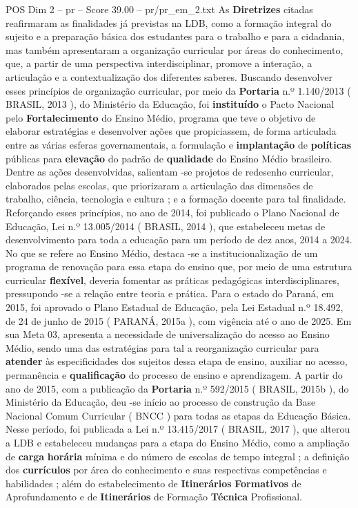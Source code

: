 \begin{textsample}{POS Dim 2 – pr – Score 39.00 – pr/pr\_em\_2.txt}
As \textbf{Diretrizes} citadas reafirmaram as finalidades já previstas na LDB, como a formação integral do sujeito e a preparação básica dos estudantes para o trabalho e para a cidadania, mas também apresentaram a organização curricular por áreas do conhecimento, que, a partir de uma perspectiva interdisciplinar, promove a interação, a articulação e a contextualização dos diferentes saberes.
Buscando desenvolver esses princípios de organização curricular, por meio da \textbf{Portaria} n.º 1.140/2013 ( BRASIL, 2013 ), do Ministério da Educação, foi \textbf{instituído} o Pacto Nacional pelo \textbf{Fortalecimento} do Ensino Médio, programa que teve o objetivo de elaborar estratégias e desenvolver ações que propiciassem, de forma articulada entre as várias esferas governamentais, a formulação e \textbf{implantação} de \textbf{políticas} públicas para \textbf{elevação} do padrão de \textbf{qualidade} do Ensino Médio brasileiro.
Dentre as ações desenvolvidas, salientam -se projetos de redesenho curricular, elaborados pelas escolas, que priorizaram a articulação das dimensões de trabalho, ciência, tecnologia e cultura ; e a formação docente para tal finalidade.
Reforçando esses princípios, no ano de 2014, foi publicado o Plano Nacional de Educação, Lei n.º 13.005/2014 ( BRASIL, 2014 ), que estabeleceu metas de desenvolvimento para toda a educação para um período de dez anos, 2014 a 2024.
No que se refere ao Ensino Médio, destaca -se a institucionalização de um programa de renovação para essa etapa do ensino que, por meio de uma estrutura curricular \textbf{flexível}, deveria fomentar as práticas pedagógicas interdisciplinares, pressupondo -se a relação entre teoria e prática.
Para o estado do Paraná, em 2015, foi aprovado o Plano Estadual de Educação, pela Lei Estadual n.º 18.492, de 24 de junho de 2015 ( PARANÁ, 2015a ), com vigência até o ano de 2025.
Em sua Meta 03, apresenta a necessidade de universalização do acesso ao Ensino Médio, sendo uma das estratégias para tal a reorganização curricular para \textbf{atender} às especificidades dos sujeitos dessa etapa de ensino, auxiliar no acesso, permanência e \textbf{qualificação} do processo de ensino e aprendizagem.
A partir do ano de 2015, com a publicação da \textbf{Portaria} n.º 592/2015 ( BRASIL, 2015b ), do Ministério da Educação, deu -se início ao processo de construção da Base Nacional Comum Curricular ( BNCC ) para todas as etapas da Educação Básica.
Nesse período, foi publicada a Lei n.º 13.415/2017 ( BRASIL, 2017 ), que alterou a LDB e estabeleceu mudanças para a etapa do Ensino Médio, como a ampliação de \textbf{carga} \textbf{horária} mínima e do número de escolas de tempo integral ; a definição dos \textbf{currículos} por área do conhecimento e suas respectivas competências e habilidades ; além do estabelecimento de \textbf{Itinerários} \textbf{Formativos} de Aprofundamento e de \textbf{Itinerários} de Formação \textbf{Técnica} Profissional.

\end{textsample}
